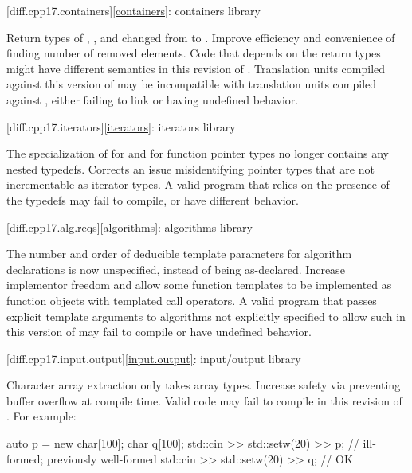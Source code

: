 [diff.cpp17.containers]{\ref{containers}: containers library}

\change
Return types of , , and 
changed from  to .
\rationale
Improve efficiency and convenience of finding number of removed elements.
\effect
Code that depends on the return types might have different semantics in this revision of \Cpp{}.
Translation units compiled against this version of \Cpp{} may be incompatible with
translation units compiled against \CppXVII{}, either failing to link or having undefined behavior.

[diff.cpp17.iterators]{\ref{iterators}: iterators library}

\change
The specialization of  for  and
for function pointer types no longer contains any nested typedefs.
\rationale
Corrects an issue misidentifying pointer types that are not incrementable
as iterator types.
\effect
A valid \CppXVII{} program that relies on the presence of the typedefs
may fail to compile, or have different behavior.

[diff.cpp17.alg.reqs]{\ref{algorithms}: algorithms library}

\change
The number and order of deducible template parameters for algorithm declarations
is now unspecified, instead of being as-declared.
\rationale
Increase implementor freedom and allow some function templates
to be implemented as function objects with templated call operators.
\effect
A valid \CppXVII{} program that passes explicit template arguments to
algorithms not explicitly specified to allow such in this version of \Cpp{}
may fail to compile or have undefined behavior.

[diff.cpp17.input.output]{\ref{input.output}: input/output library}

\change
Character array extraction only takes array types.
\rationale
Increase safety via preventing buffer overflow at compile time.
\effect
Valid \CppXVII{} code may fail to compile in this revision of \Cpp{}.
For example:
\begin{codeblock}
auto p = new char[100];
char q[100];
std::cin >> std::setw(20) >> p;         // ill-formed; previously well-formed
std::cin >> std::setw(20) >> q;         // OK
\end{codeblock}

